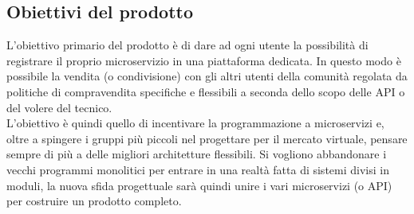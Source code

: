 \documentclass[12pt,a4paper,titlepage]{article}
\begin{document}
	\subsection{Obiettivi del prodotto}
	L'obiettivo primario del prodotto è di dare ad ogni utente la possibilità di registrare il proprio microservizio in una piattaforma dedicata. In questo modo è possibile la vendita (o condivisione) con gli altri utenti della comunità regolata da politiche di compravendita specifiche e flessibili a seconda dello scopo delle API o del volere del tecnico.\\
	L'obiettivo è quindi quello di incentivare la programmazione a microservizi e, oltre a spingere i gruppi più piccoli nel progettare per il mercato virtuale, pensare sempre di più a delle migliori architetture flessibili. Si vogliono abbandonare i vecchi programmi monolitici per entrare in una realtà fatta di sistemi divisi in moduli, la nuova sfida progettuale sarà quindi unire i vari microservizi (o API) per costruire un prodotto completo.
	
\end{document}
